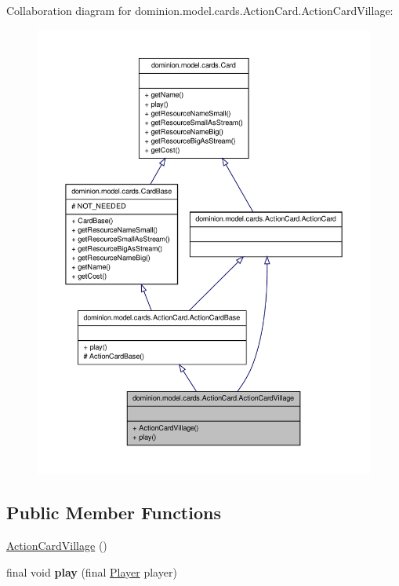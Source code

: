 \-Collaboration diagram for dominion.\-model.\-cards.\-Action\-Card.\-Action\-Card\-Village\-:
\nopagebreak
\begin{figure}[H]
\begin{center}
\leavevmode
\includegraphics[width=350pt]{classdominion_1_1model_1_1cards_1_1ActionCard_1_1ActionCardVillage__coll__graph}
\end{center}
\end{figure}
\subsection*{\-Public \-Member \-Functions}
\begin{DoxyCompactItemize}
\item 
\hyperlink{classdominion_1_1model_1_1cards_1_1ActionCard_1_1ActionCardVillage_a0c4e3604018ef017b55f874e16871ad4}{\-Action\-Card\-Village} ()
\item 
\hypertarget{classdominion_1_1model_1_1cards_1_1ActionCard_1_1ActionCardVillage_a6bb2a8600788fdf243c25d85087e9cab}{final void {\bfseries play} (final \hyperlink{interfacedominion_1_1model_1_1Player}{\-Player} player)}\label{classdominion_1_1model_1_1cards_1_1ActionCard_1_1ActionCardVillage_a6bb2a8600788fdf243c25d85087e9cab}

\end{DoxyCompactItemize}


